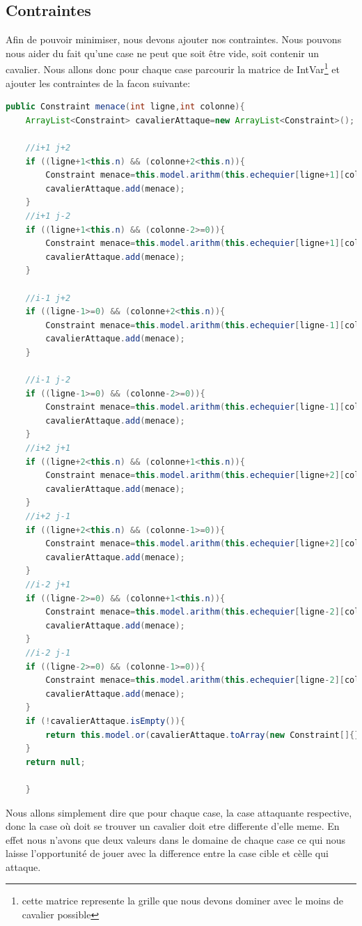 \documentclass[a4paper,10pt]{article}
\begin{document}
\subsection{Contraintes}
\par Afin de pouvoir minimiser, nous devons ajouter nos contraintes. Nous pouvons nous aider du fait qu'une case ne peut que soit être vide, soit contenir un cavalier. Nous allons donc pour chaque case parcourir la matrice de IntVar\footnote{cette matrice represente la grille que nous devons dominer avec le moins de cavalier possible} et ajouter les contraintes de la facon suivante:
\begin{lstlisting}[language=Java,basicstyle=\tiny]
public Constraint menace(int ligne,int colonne){
	ArrayList<Constraint> cavalierAttaque=new ArrayList<Constraint>();
		
	//i+1 j+2
	if ((ligne+1<this.n) && (colonne+2<this.n)){
		Constraint menace=this.model.arithm(this.echequier[ligne+1][colonne+2], "!=", this.echequier[ligne][colonne]);
		cavalierAttaque.add(menace);
	}
	//i+1 j-2
	if ((ligne+1<this.n) && (colonne-2>=0)){
		Constraint menace=this.model.arithm(this.echequier[ligne+1][colonne-2], "!=", this.echequier[ligne][colonne]);
		cavalierAttaque.add(menace);
	}
	
	//i-1 j+2
	if ((ligne-1>=0) && (colonne+2<this.n)){
		Constraint menace=this.model.arithm(this.echequier[ligne-1][colonne+2], "!=", this.echequier[ligne][colonne]);
		cavalierAttaque.add(menace);
	}
	
	//i-1 j-2
	if ((ligne-1>=0) && (colonne-2>=0)){
		Constraint menace=this.model.arithm(this.echequier[ligne-1][colonne-2], "!=", this.echequier[ligne][colonne]);
		cavalierAttaque.add(menace);
	}
	//i+2 j+1	
	if ((ligne+2<this.n) && (colonne+1<this.n)){
		Constraint menace=this.model.arithm(this.echequier[ligne+2][colonne+1], "!=", this.echequier[ligne][colonne]);
		cavalierAttaque.add(menace);
	}
	//i+2 j-1
	if ((ligne+2<this.n) && (colonne-1>=0)){
		Constraint menace=this.model.arithm(this.echequier[ligne+2][colonne-1], "!=",this.echequier[ligne][colonne]);
		cavalierAttaque.add(menace);
	}
	//i-2 j+1
	if ((ligne-2>=0) && (colonne+1<this.n)){
		Constraint menace=this.model.arithm(this.echequier[ligne-2][colonne+1], "!=",this.echequier[ligne][colonne]);
		cavalierAttaque.add(menace);
	}
	//i-2 j-1
	if ((ligne-2>=0) && (colonne-1>=0)){
		Constraint menace=this.model.arithm(this.echequier[ligne-2][colonne-1], "!=", this.echequier[ligne][colonne]);
		cavalierAttaque.add(menace);
	}
	if (!cavalierAttaque.isEmpty()){
		return this.model.or(cavalierAttaque.toArray(new Constraint[]{}));
	}
	return null;
		
	}
\end{lstlisting}
Nous allons simplement dire que pour chaque case, la case attaquante respective, donc la case où doit se trouver un cavalier doit etre differente d'elle meme. En effet nous n'avons que deux valeurs dans le domaine de chaque case ce qui nous laisse l'opportunité de jouer avec la difference entre la case cible et cèlle qui attaque.
\end{document}
